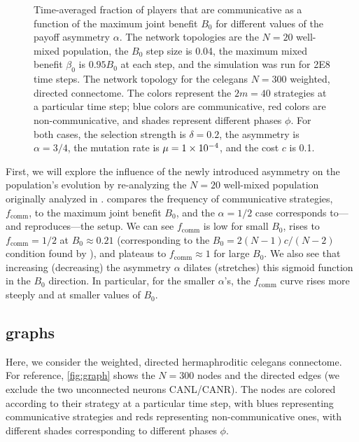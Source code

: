 \documentclass[pdflatex,lineno,referee,sn-mathphys-ay]{sn-jnl}
\begin{document}
\begin{figure}
  \centering
  
  \caption{
    Time-averaged fraction of players that are communicative as a function
    of the maximum joint benefit $B_0$
    for different values of the payoff asymmetry $\alpha$.
    The network topologies are the
    $N=20$ well-mixed population,
    the $B_0$ step size is \num{0.04},
    the maximum mixed benefit $\beta_0$ is $\num{0.95} B_0$ at each step,
    and the simulation was run for \num{2E8} time steps.
    The network topology for the \gls{celegans}
    $N=300$ weighted, directed connectome.
    The colors represent the $2m = 40$ strategies
    at a particular time step;
    blue colors are communicative,
    red colors are non-communicative,
    and shades represent different phases $\phi$.
    For both cases,
    the selection strength is $\delta=0.2$,
    the asymmetry is $\alpha=3/4$,
    the mutation rate is $\mu=\num{1E-4}$,
    and
    the cost $c$ is \num{0.1}.
  }
  \label{fig:graph_multi-comm-frac}
\end{figure}

First, we will explore the influence of the newly introduced asymmetry
on the population's evolution by
re-analyzing the $N=20$ well-mixed population
originally analyzed in \citet{tripp2022evolutionary}.
 compares the frequency of communicative strategies,
$f_{\text{comm}}$, to the maximum joint benefit $B_0$,
and the $\alpha=1/2$ case corresponds to---and reproduces---the
\citet{tripp2022evolutionary} setup.
We can see $f_{\text{comm}}$ is low for small $B_0$,
rises to $f_{\text{comm}} = 1/2$ at $B_0 \approx 0.21$
(corresponding to the $B_0 = 2 (N-1) c/(N-2)$ condition
found by \citet{tripp2022evolutionary}),
and plateaus to $f_{\text{comm}} \approx 1$ for large $B_0$.
We also see that increasing (decreasing)
the asymmetry $\alpha$ dilates (stretches) this sigmoid function
in the $B_0$ direction.
In particular, for the smaller $\alpha$'s, the $f_{\text{comm}}$ curve
rises more steeply and at smaller values of $B_0$.

\subsection{ graphs}
\label{sec:elegans_graph}

Here, we consider the weighted, directed hermaphroditic \gls{celegans} connectome.
For reference, \cref{fig:graph} shows the $N = 300$ nodes and the directed edges
(we exclude the two unconnected neurons CANL/CANR).
The nodes are colored according to their strategy at a particular time step,
with blues representing communicative strategies
and reds representing non-communicative ones,
with different shades corresponding to different phases $\phi$.
\end{document}
